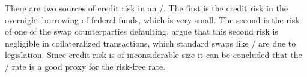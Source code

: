 \documentclass[main.tex]{subfiles}
\begin{document}
    There are two sources of credit risk in an \OIS/.
    The first is the credit risk in the overnight borrowing of federal funds, which is very small. 
    The second is the risk of one of the swap counterparties defaulting.
    \textcite{HullWhiteOISvsLIBOR}
    argue that this second risk is negligible in collateralized transactions,
    which standard swaps like \OIS/ are due to legislation.
    Since credit risk is of inconsiderable size it can be concluded 
    that the \OIS/ rate is a good proxy for the risk-free rate.
\end{document}
